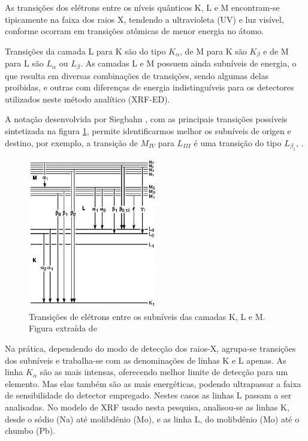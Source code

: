 As transições dos elétrons entre os níveis quânticos K, L e M encontram-se 
tipicamente na faixa dos raios X, tendendo a ultravioleta (UV) e luz visível,
conforme ocorram em transições atômicas de menor energia no átomo.

Transições da camada L para K são do tipo $K_{\alpha}$, de M para K 
são $K_{\beta}$ e de M para L são $L_{\alpha}$ ou $L_{\beta}$. 
As camadas L e M possuem ainda subníveis de energia, o que resulta em diversas
combinações de transições, sendo algumas delas proibidas, e outras 
com diferenças de energia indistinguíveis para os detectores utilizados 
neste método analítico (XRF-ED).

A notação desenvolvida por Siegbahn \citep{jenkins1991}, 
com as principais transições possíveis sintetizada na figura \ref{fig:siegbahn},
permite identificarmos melhor os subníveis de origen e destino, por exemplo, 
a transição de $M_{IV}$ para $L_{III}$ é uma transição do tipo $L_{\beta_1}$,  . 

\begin{figure}[H]
  \centering 
  \includegraphics[width=0.5\textwidth]{../inputs/images/Siegbahn.jpg}
  \caption{Transições de elétrons entre os subníveis das camadas K, L e M. 
           Figura extraída de \citet{jenkins1991} \label{fig:siegbahn}}
\end{figure}

Na prática, dependendo do modo de detecção dos raios-X, agrupa-se transições 
dos subníveis e trabalha-se com as denominações de linhas K e L apenas. As linha
$K_{\alpha}$ são as mais intensas, oferecendo melhor limite de detecção
para um elemento. Mas elas também são as mais energéticas, podendo ultrapassar a
faixa de sensibilidade do detector empregado. Nestes casos as linhas L passam a 
ser analisadas. No modelo de XRF usado nesta pesquisa, analisou-se as linhas K, 
desde o sódio (Na) até molibdênio (Mo), e as linha L, do molibdênio (Mo)
até o chumbo (Pb).  
 
